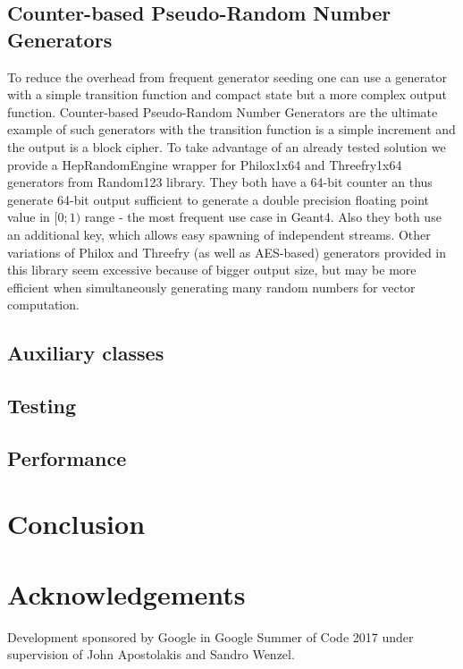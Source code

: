 \documentclass[a4paper, titlepage, 12pt]{article} %
\begin{document}
 \subsection{Counter-based Pseudo-Random Number Generators}
  To reduce the overhead from frequent generator seeding one can use a generator with a simple transition function and compact state but a more complex output function. %
  Counter-based Pseudo-Random Number Generators are the ultimate example of such generators with the transition function is a simple increment and the output is a block cipher.
  To take advantage of an already tested solution we provide a HepRandomEngine wrapper for Philox1x64 and Threefry1x64 generators from Random123 library. %
  They both have a 64-bit counter an thus generate 64-bit output sufficient to generate a double precision floating point value in $[0;1)$ range - the most frequent use case in Geant4.
  Also they both use an additional key, which allows easy spawning of independent streams.
  Other variations of Philox and Threefry (as well as AES-based) generators provided in this library seem excessive because of bigger output size, but may be more efficient when simultaneously generating many random numbers for vector computation.
 
 \subsection{Auxiliary classes}
 
 \subsection{Testing}
 
 \subsection{Performance}
 
 
 \section{Conclusion}
 
 \section{Acknowledgements}
  Development sponsored by Google in Google Summer of Code 2017 under supervision of John Apostolakis and Sandro Wenzel.
 
 
 
 
 \appendix
  
\end{document}

